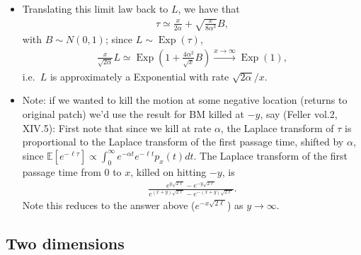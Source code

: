 \documentclass{article}
\newcommand{\E}{\mathbb{E}}
\newcommand{\Exp}{\mathop{\mbox{Exp}}}
\begin{document}
\begin{itemize}
\item Translating this limit law back to $L$, we have that
\begin{align}
  \tau \simeq \frac{x}{2\alpha} + \sqrt{\frac{x}{8\alpha^3}} B,
\end{align}
with $B \sim N(0,1)$; since $L \sim \Exp(\tau)$,
\begin{align}
  \frac{x}{\sqrt{2\alpha}} L \simeq \Exp\left(1+\frac{4\alpha^2}{\sqrt{x}}B\right) \xrightarrow{x\to\infty} \Exp(1),
\end{align}
i.e.\ $L$ is approximately a Exponential with rate $\sqrt{2\alpha}/x$.

\item Note: if we wanted to kill the motion at some negative location (returns to original patch)
we'd use the result for BM killed at $-y$, say (Feller vol.2, XIV.5):
First note that since we kill at rate $\alpha$, the Laplace transform of $\tau$ is proportional to the Laplace transform of the first passage time,
shifted by $\alpha$, since $\E[e^{-\ell \tau}] \propto \int_0^\infty e^{-\alpha t} e^{-\ell t} p_x(t) dt$.
The Laplace transform of the first passage time from $0$ to $x$, killed on hitting $-y$, is
\begin{align}
 \frac{ e^{y\sqrt{2\ell}} - e^{-y\sqrt{2\ell}} } { e^{(x+y)\sqrt{2\ell}} - e^{-(x+y)\sqrt{2\ell}} } .
\end{align}
Note this reduces to the answer above ($e^{-x\sqrt{2\ell}}$) as $y \to \infty$.


\end{itemize}

\subsection{Two dimensions}
\end{document}

